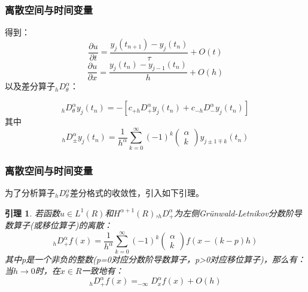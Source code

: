 \documentclass[notheorems,serif]{beamer}
\newcommand{\hei}[1]{{\HEI#1}}
\newtheorem{lemma}{\hei{引理}}
\begin{document}
\begin{frame}
\frametitle{离散空间与时间变量}
\qquad 得到：
\begin{equation}
\frac{\partial u}{\partial t}=\frac{y_{j}\left(t_{n+1}\right)-y_{j}\left(t_{n}\right)}{\tau}+O(t)
\end{equation}
\begin{equation}
\frac{\partial u}{\partial x}=\frac{y_{j}\left(t_{n}\right)-y_{j-1}\left(t_{n}\right)}{h}+O(h)
\end{equation}
以及差分算子$_{h} D_{\theta}^{\alpha}$：

\begin{equation}
_{h} D_{\theta}^{\alpha} y_{j}\left(t_{n}\right)=-\left[c_{+h} D_{+}^{\alpha} y_{j}\left(t_{n}\right)+c_{-h} D_{-}^{\alpha} y_{j}\left(t_{n}\right)\right]
\end{equation}
其中
\begin{equation}
_{h} D_{ \pm}^{\alpha} y_{j}\left(t_{n}\right)=\frac{1}{h^{\alpha}} \sum_{k=0}^{\infty}(-1)^{k} \left( \begin{array}{l}{\alpha} \\ {k}\end{array}\right) y_{j \pm 1 \mp k}\left(t_{n}\right)
\end{equation}
\end{frame}

\begin{frame}
\frametitle{离散空间与时间变量}
\qquad 为了分析算子$_{h} D_{\theta}^{\alpha}$差分格式的收敛性，引入如下引理。
\begin{lemma}
	若函数$u \in L^1(R)$和$H^{\alpha+1}(R)$,$_{h} D_{+}^{\alpha}$为左侧Grünwald-Letnikov分数阶导数算子(或移位算子)的离散：
	\begin{equation}
	_{h} D_{+}^{\alpha} f(x)=\frac{1}{h^{\alpha}} \sum_{k=0}^{\infty}(-1)^{k} \left( \begin{array}{l}{\alpha} \\ {k}\end{array}\right) f(x-(k-p) h)
	\end{equation}
	其中p是一个非负的整数(p=0对应分数阶导数算子，p>0对应移位算子)，那么有：当$h \to 0$时，在$x \in R$一致地有：
	\begin{equation}
	_{h} D_{+}^{\alpha} f(x)=_{-\infty} D_{x}^{\alpha} f(x)+O(h)
	\end{equation}
\end{lemma}
\end{frame}
\end{document}
